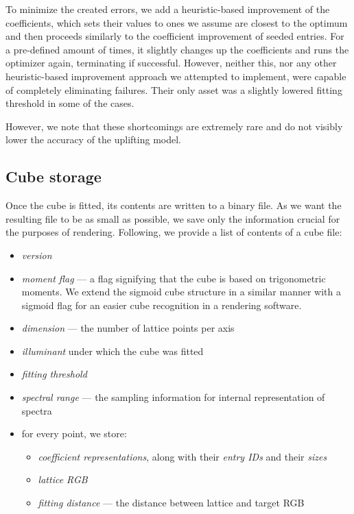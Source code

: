To minimize the created errors, we add a heuristic-based improvement of the coefficients, which sets their values to ones we assume are closest to the optimum and then proceeds similarly to the coefficient improvement of seeded entries. For a pre-defined amount of times, it slightly changes up the coefficients and runs the optimizer again, terminating if successful. However, neither this, nor any other heuristic-based improvement approach we attempted to implement, were capable of completely eliminating failures. Their only asset was a slightly lowered fitting threshold in some of the cases.

However, we note that these shortcomings are extremely rare and do not visibly lower the accuracy of the uplifting model.

\subsection{Cube storage}

Once the cube is fitted, its contents are written to a binary file. As we want the resulting file to be as small as possible, we save only the information crucial for the purposes of rendering. Following, we provide a list of contents of a cube file:
\begin{itemize}
	\item \emph{version}
	\item \emph{moment flag} --- a flag signifying that the cube is based on trigonometric moments. We extend the sigmoid cube structure in a similar manner with a sigmoid flag for an easier cube recognition in a rendering software.
	\item \emph{dimension} --- the number of lattice points per axis
	\item \emph{illuminant} under which the cube was fitted
	\item \emph{fitting threshold}
	\item \emph{spectral range} --- the sampling information for internal representation of spectra
	\item for every point, we store:
	\begin{itemize}
		\item \emph{coefficient representations}, along with their \emph{entry IDs} and their \emph{sizes}
		\item \emph{lattice RGB}
		\item \emph{fitting distance} --- the distance between lattice and target RGB
	\end{itemize}
\end{itemize}

